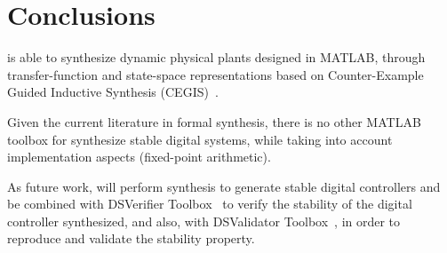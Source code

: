 \section{Conclusions}

\tool is able to synthesize dynamic physical plants designed in MATLAB, through transfer-function and state-space representations based on Counter-Example Guided Inductive Synthesis (CEGIS)~\cite{DBLP:conf/asplos/Solar-LezamaTBSS06}.

Given the current literature in formal synthesis, there is no other MATLAB toolbox for synthesize stable digital systems, while taking into account implementation aspects (fixed-point arithmetic). 

As future work, \tool will perform synthesis to generate stable digital controllers and be combined with DSVerifier Toolbox~\cite{issta2017} to verify the stability of the digital controller synthesized, and also, with DSValidator Toolbox~\cite{dsvalidator}, in order to reproduce and validate the stability property.  
